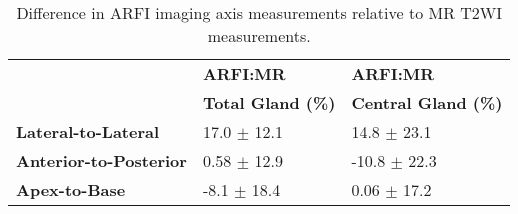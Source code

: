 \begin{table}[h!]
\centering
\caption{Difference in ARFI imaging axis measurements relative to MR T2WI measurements.}
\begin{tabular}{|l|l|l|} \hline
 & {\bf ARFI:MR} & {\bf ARFI:MR} \\
 & {\bf Total Gland (\%)} & {\bf Central Gland (\%)} \\ \hline
{\bf Lateral-to-Lateral} & 17.0 $\pm$ 12.1 & 14.8 $\pm$ 23.1 \\
{\bf Anterior-to-Posterior} & 0.58 $\pm$ 12.9 & -10.8 $\pm$ 22.3 \\
{\bf Apex-to-Base} & -8.1 $\pm$ 18.4 & 0.06 $\pm$ 17.2 \\
\hline
\end{tabular}
\label{tab:mr_arfi_axes_error}
\end{table}

